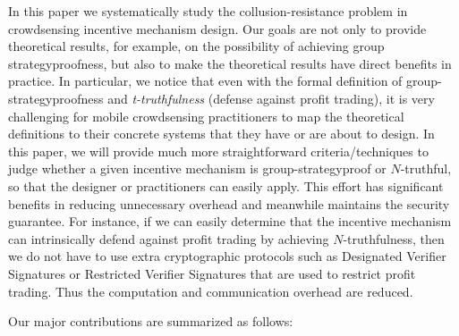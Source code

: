 \documentclass[conference]{IEEEtran}
\theoremstyle{definition}
\begin{document}

In this paper we systematically study the collusion-resistance problem in crowdsensing incentive mechanism design. Our goals are not only to provide theoretical results, for example, on the possibility of achieving group strategyproofness, but also to make the theoretical results have direct benefits in practice. In particular, we notice that even with the formal definition of group-strategyproofness and \textit{t-truthfulness} (defense against profit trading), it is very challenging for mobile crowdsensing practitioners to map the theoretical definitions to their concrete systems that they have or are about to design. In this paper, we will provide much more straightforward criteria/techniques to judge whether a given incentive mechanism is group-strategyproof or $N$-truthful, so that the designer or practitioners can easily apply. This effort has significant benefits in reducing unnecessary overhead and meanwhile maintains the security guarantee. For instance, if we can easily determine that the incentive mechanism can intrinsically defend against profit trading by achieving $N$-truthfulness, then we do not have to use extra cryptographic protocols such as Designated Verifier Signatures \cite{jakobsson1996designated} or Restricted Verifier Signatures \cite{zhong2007designing} that are used to restrict profit trading. Thus the computation and communication overhead are reduced.



Our major contributions are summarized as follows:
\end{document}
